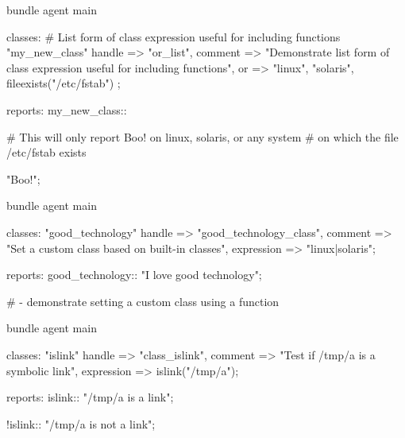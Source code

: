 \begin{codelisting}
\begin{code}
bundle agent main
{
  classes:
      # List form of class expression useful for including functions
      "my_new_class"
        handle => "or_list",
        comment => "Demonstrate list form of class expression
                          useful for including functions",
        or   => { "linux",
                  "solaris",
                  fileexists("/etc/fstab")
        };

  reports:
    my_new_class::

      # This will only report Boo! on linux, solaris, or any system
      # on which the file /etc/fstab exists

      "Boo!";
}

\end{code}
\end{codelisting}
\begin{codelisting}
\begin{code}
bundle agent main
{
  classes:
      "good_technology"
        handle => "good_technology_class",
        comment => "Set a custom class based on built-in classes",
        expression => "linux|solaris";

  reports:
    good_technology::
      "I love good technology";

}
\end{code}
\end{codelisting}
\begin{codelisting}
\begin{code}
# - demonstrate setting a custom class using a function

bundle agent main
{
  classes:
      "islink"
        handle => "class_islink",
        comment => "Test if /tmp/a is a symbolic link",
        expression => islink("/tmp/a");

  reports:
    islink::
      "/tmp/a is a link";

    !islink::
      "/tmp/a is not a link";
}
\end{code}
\end{codelisting}
